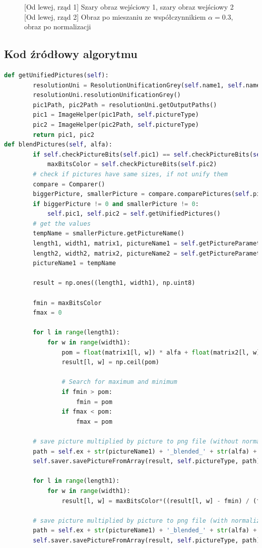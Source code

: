 \documentclass[a4paper,12pt, titlepage]{report}
\begin{document}
\begin{figure}[h]
    \caption{[Od lewej, rząd 1] Szary obraz wejściowy 1, szary obraz wejściowy 2 [Od lewej, rząd 2] Obraz po mieszaniu ze współczynnikiem \(\alpha=0.3\), obraz po normalizacji}%
    \label{fig:geo_after_grey1}%
\end{figure}
\FloatBarrier
\subsection*{Kod źródłowy algorytmu}
\begin{lstlisting}[language=Python]
def getUnifiedPictures(self):
        resolutionUni = ResolutionUnificationGrey(self.name1, self.name2)
        resolutionUni.resolutionUnificationGrey()
        pic1Path, pic2Path = resolutionUni.getOutputPaths()
        pic1 = ImageHelper(pic1Path, self.pictureType)
        pic2 = ImageHelper(pic2Path, self.pictureType)
        return pic1, pic2
def blendPictures(self, alfa):
        if self.checkPictureBits(self.pic1) == self.checkPictureBits(self.pic2):
            maxBitsColor = self.checkPictureBits(self.pic2)
        # check if pictures have same sizes, if not unify them
        compare = Comparer()
        biggerPicture, smallerPicture = compare.comparePictures(self.pic1, self.pic2)
        if biggerPicture != 0 and smallerPicture != 0:
            self.pic1, self.pic2 = self.getUnifiedPictures()
        # get the values
        tempName = smallerPicture.getPictureName()
        length1, width1, matrix1, pictureName1 = self.getPictureParameters(self.pic1)
        length2, width2, matrix2, pictureName2 = self.getPictureParameters(self.pic2)
        pictureName1 = tempName

        result = np.ones((length1, width1), np.uint8)

        fmin = maxBitsColor
        fmax = 0

        for l in range(length1):
            for w in range(width1):
                pom = float(matrix1[l, w]) * alfa + float(matrix2[l, w]) * (1 - alfa)
                result[l, w] = np.ceil(pom)

                # Search for maximum and minimum
                if fmin > pom:
                    fmin = pom
                if fmax < pom:
                    fmax = pom

        # save picture multiplied by picture to png file (without normalization)
        path = self.ex + str(pictureName1) + '_blended_' + str(alfa) + '_' + str(pictureName2) + '.png'
        self.saver.savePictureFromArray(result, self.pictureType, path)

        for l in range(length1):
            for w in range(width1):
                result[l, w] = maxBitsColor*((result[l, w] - fmin) / (fmax - fmin))

        # save picture multiplied by picture to png file (with normalization)
        path = self.ex + str(pictureName1) + '_blended_' + str(alfa) + '_' + str(pictureName2) + '_normalized.png'
        self.saver.savePictureFromArray(result, self.pictureType, path)
\end{lstlisting}
\end{document}
